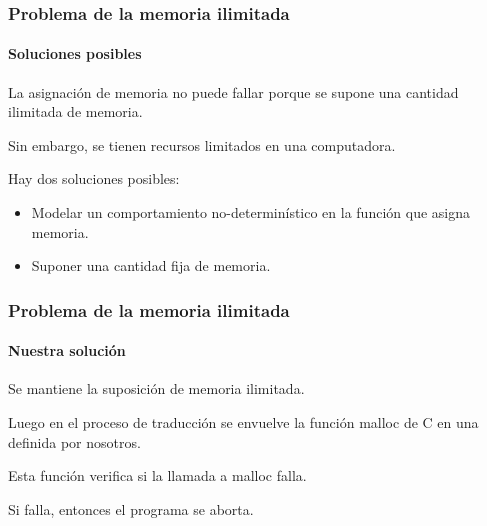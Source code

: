\begin{comment}
\begin{frame}[fragile]
\frametitle{Memoria dinámica}
\framesubtitle{Operaciones de manejo de memoria}

\begin{itemize}
\item<1-3>{new\_block :: $val\ \Rightarrow\ mem\ \Rightarrow\ (val\ \times\ mem)$ option}
\item<1,2,4>{free :: $addr\ \Rightarrow\ visible\_state\ \Rightarrow\ visible\_state$ option}
\item<1,2,5>{load :: $addr\ \Rightarrow\ mem\ \Rightarrow\ val$ option}
\item<1,2,6>{store :: $addr\ \Rightarrow\ val\ \Rightarrow\ visible\_state\ \Rightarrow\ visible\_state$ option}
\end{itemize}

\alert<2>{Los tipos de retorno son $\tau$ option, ya que las funciones siempre pueden fallar.}

\end{frame}
\end{comment}


\begin{frame}[fragile]
\frametitle{Problema de la memoria ilimitada}
\framesubtitle{Soluciones posibles}

La asignación de memoria no puede fallar porque se supone una cantidad ilimitada de memoria.

\bigskip

Sin embargo, se tienen recursos limitados en una computadora.

Hay dos soluciones posibles:

\begin{itemize}
\item{Modelar un comportamiento no-determinístico en la función que asigna memoria.}
\item{Suponer una cantidad fija de memoria.}
\end{itemize}


\end{frame}


\begin{frame}
\frametitle{Problema de la memoria ilimitada}
\framesubtitle{Nuestra solución}

Se mantiene la suposición de memoria ilimitada.

\bigskip
Luego en el proceso de traducción se envuelve la función malloc de C en una definida por nosotros.

\bigskip
Esta función verifica si la llamada a malloc falla.

\bigskip
Si falla, entonces el programa se aborta.


\end{frame}


